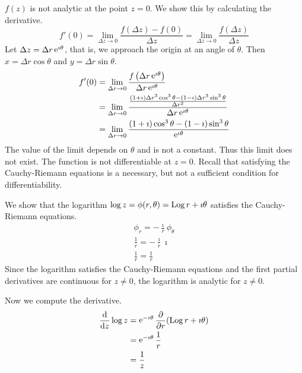 {\begin{Solution}
  $f(z)$ is not analytic at the point $z = 0$.  We show this by calculating
  the derivative.
  \[
  f'(0) = \lim_{\Delta z \to 0} \frac{f(\Delta z) - f(0)}{\Delta z}
  = \lim_{\Delta z \to 0} \frac{f(\Delta z)}{\Delta z}
  \]
  Let $\Delta z = \Delta r \mathop{\mathrm{e}}\nolimits^{\imath \theta}$, that is, we approach the origin
  at an angle of $\theta$.  Then $x = \Delta r \cos \theta$ and
  $y = \Delta r \sin \theta$.
  \begin{align*}
    f'(0)   &= \lim_{\Delta r \to 0} \frac{ f\left( \Delta r \mathop{\mathrm{e}}\nolimits^{\imath \theta} \right)}
    {\Delta r \mathop{\mathrm{e}}\nolimits^{\imath \theta} } 
    \\
    &= \lim_{\Delta r \to 0} \frac{
      \frac{  (1 + \imath) \Delta r^3 \cos^3 \theta - (1 - \imath) \Delta r^3 \sin^3 \theta }{\Delta r^2} }
    {\Delta r \mathop{\mathrm{e}}\nolimits^{\imath \theta} } 
    \\
    &= \lim_{\Delta r \to 0} 
    \frac{ (1 + \imath) \cos^3 \theta - (1 - \imath) \sin^3 \theta }
    {\mathop{\mathrm{e}}\nolimits^{\imath \theta} } 
  \end{align*}
  The value of the limit depends on $\theta$ and
  is not a constant.  Thus this limit does not exist.  The function is 
  not differentiable at $z = 0$.  Recall that satisfying the Cauchy-Riemann 
  equations is a necessary, but not a sufficient condition for 
  differentiability.  
\end{Solution}







\begin{Solution}
  \label{solution diff log}
  We show that the logarithm $\log z = \phi(r,\theta) = \mathop{\mathrm{Log}}\nolimits r + \imath \theta$ satisfies the 
  Cauchy-Riemann equations.
  \begin{gather*}
    \phi_r = - \frac{\imath}{r} \phi_\theta 
    \\
    \frac{1}{r} = - \frac{\imath}{r} \imath 
    \\
    \frac{1}{r} = \frac{1}{r} 
  \end{gather*}
  Since the logarithm satisfies the Cauchy-Riemann equations and the first 
  partial derivatives are continuous for $z \neq 0$, the logarithm is analytic
  for $z \neq 0$.

  Now we compute the derivative.
  \begin{align*}
    \frac{\mathrm{d}}{\mathrm{d} z} \log z 
    &= \mathop{\mathrm{e}}\nolimits^{-\imath \theta} \frac{\partial}{\partial r} (\mathop{\mathrm{Log}}\nolimits r + \imath \theta) 
    \\
    &= \mathop{\mathrm{e}}\nolimits^{-\imath \theta} \frac{1}{r} 
    \\
    &= \frac{1}{z}
  \end{align*}
\end{Solution}







}
